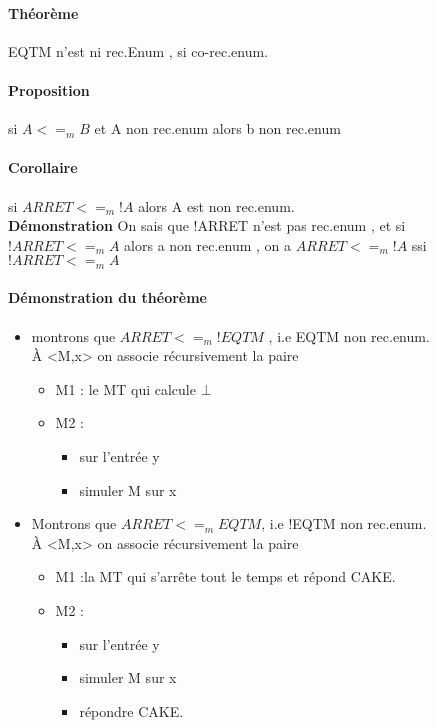 \documentclass{article}
\begin{document}
{{\paragraph{Théorème} EQTM n'est ni rec.Enum , si co-rec.enum.
\paragraph{Proposition} si $A<=_{m}B$ et A non rec.enum alors b non rec.enum
\paragraph{Corollaire} si $ARRET<=_{m}!A$ alors A est non rec.enum.\\\textbf{Démonstration}  On sais que !ARRET n'est pas rec.enum , et si $!ARRET<=_{m}A$  alors a non rec.enum , on a $ARRET<=_{m}!A$ ssi $!ARRET<=_{m}A$

\paragraph{Démonstration du théorème}
\begin{itemize}
\item montrons que $ARRET<=_{m}!EQTM$ , i.e EQTM non rec.enum.\\À <M,x> on associe récursivement la paire
\begin{itemize}
\item M1 : le MT qui calcule $\bot$
\item M2 : 
\begin{itemize}
\item sur l'entrée y
\item simuler M sur x
\end{itemize}
\end{itemize}
\item Montrons que $ARRET<=_{m}EQTM$, i.e !EQTM non rec.enum.\\À <M,x> on associe récursivement la paire
\begin{itemize}
\item M1  :la MT qui s’arrête tout le temps et répond CAKE.
\item M2 : 
\begin{itemize}
\item sur l'entrée  y 
\item simuler M sur x
\item répondre CAKE.
\end{itemize}
\end{itemize}
\end{itemize}
}}
\end{document}
